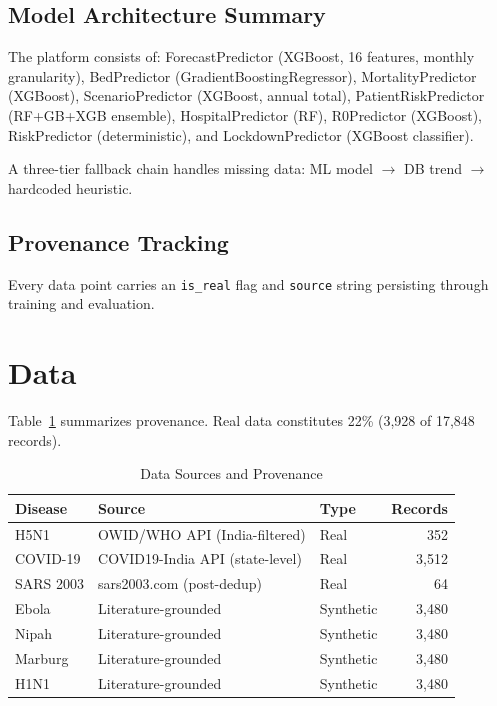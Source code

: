 \documentclass{ieeeaccess}
\begin{document}
\subsection{Model Architecture Summary}
The platform consists of: ForecastPredictor (XGBoost, 16 features, monthly granularity), BedPredictor (GradientBoostingRegressor), MortalityPredictor (XGBoost), ScenarioPredictor (XGBoost, annual total), PatientRiskPredictor (RF+GB+XGB ensemble), HospitalPredictor (RF), R0Predictor (XGBoost), RiskPredictor (deterministic), and LockdownPredictor (XGBoost classifier).

A three-tier fallback chain handles missing data: ML model $\rightarrow$ DB trend $\rightarrow$ hardcoded heuristic.

\subsection{Provenance Tracking}
Every data point carries an \texttt{is\_real} flag and \texttt{source} string persisting through training and evaluation.

\section{Data}
\label{sec:data}

Table~\ref{tab:data} summarizes provenance. Real data constitutes 22\% (3,928 of 17,848 records).

\begin{table}[h]
\centering
\caption{Data Sources and Provenance}
\label{tab:data}
\small
\begin{tabular}{lllr}
\toprule
Disease & Source & Type & Records \\
\midrule
H5N1 & OWID/WHO API (India-filtered) & Real & 352 \\
COVID-19 & COVID19-India API (state-level) & Real & 3,512 \\
SARS 2003 & sars2003.com (post-dedup) & Real & 64 \\
Ebola & Literature-grounded\footnotemark[1] & Synthetic & 3,480 \\
Nipah & Literature-grounded\footnotemark[1] & Synthetic & 3,480 \\
Marburg & Literature-grounded\footnotemark[1] & Synthetic & 3,480 \\
H1N1 & Literature-grounded\footnotemark[1] & Synthetic & 3,480 \\
\bottomrule
\end{tabular}
\end{table}
\end{document}
